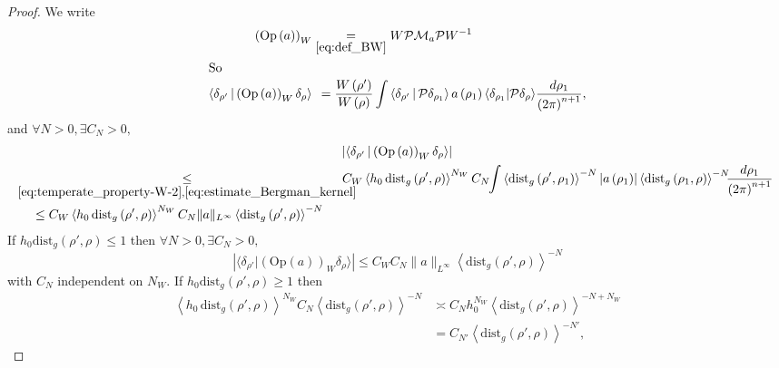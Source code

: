 \documentclass[10pt]{amsart}
\theoremstyle{definition}\newtheorem{defi}[theo]{Definition}\newtheorem{rema}[theo]{Remark}\newtheorem{exam}[theo]{Example}\newtheorem{exem}[theo]{Example}\newtheorem{nota}[theo]{Notation}
\newcommand{\clM}{\mathcal{M}}
\newcommand{\clP}{\mathcal{P}}
\newcommand{\dist}{\mathrm{dist}}
\newcommand{\Opp}{\mathrm{Op}}
\let\oldexists\exists
\renewcommand*{\exists}{\mathrel{\oldexists}}
\let\oldforall\forall
\renewcommand*{\forall}{\mathrel{\oldforall}}
\begin{document}
\begin{proof}
We write
\begin{align*}
\left(\Opp \left(a\right)\right)_{W}&\underset{\eqref{eq:def_BW}}{=} W\clP \clM_{a}\clP W^{-1}
\\
\intertext{So}
\left\langle\delta_{\rho'}\,\middle|\, \left(\Opp \left(a\right)\right)_{W}\delta_{\rho}\right\rangle &\mkern8mu=\frac{W\left(\rho'\right)}{W\left(\rho\right)}\int\left\langle\delta_{\rho'}\,\middle|\,\clP \delta_{\rho_{1}}\right\rangle a\left(\rho_{1}\right)\langle\delta_{\rho_{1}}|\clP \delta_{\rho}\rangle\frac{d\rho_{1}}{\left(2\pi\right)^{n+1}},
\end{align*}
and $\forall N>0,\exists C_{N}>0,$
\begin{multline*}
\left|\langle\delta_{\rho'}\,\middle|\,\left(\Opp \left(a\right)\right)_{W}\delta_{\rho}\rangle\right|\\
\begin{aligned}
&\mkern-10mu\underset{\eqref{eq:temperate_property-W-2},\eqref{eq:estimate_Bergman_kernel}}{\leq}\mkern-25mu C_{W}\left\langle h_{0}\,\dist_{g}\left(\rho',\rho\right)\right\rangle ^{N_{W}}C_{N}\mkern-5mu
\int\left\langle \dist_{g}\left(\rho',\rho_{1}\right)\right\rangle ^{-N}\left|a\left(\rho_{1}\right)\right|\left\langle \dist_{g}\left(\rho_{1},\rho\right)\right\rangle ^{-N}\mkern-8mu\frac{d\rho_{1}}{\left(2\pi\right)^{n+1}}\\
&\mkern15mu\leq  C_{W}\left\langle h_{0}\,\dist_{g}\left(\rho',\rho\right)\right\rangle ^{N_{W}}C_{N}\|a\|_{L^{\infty}}\left\langle \dist_{g}\left(\rho',\rho\right)\right\rangle ^{-N}
\end{aligned}
\end{multline*}
If $h_{0}\dist_{g}(\rho',\rho)\leq1$ then $\forall N>0,\exists C_{N}>0,$
\[
\left|\langle\delta_{\rho'}|\left(\Opp \left(a\right)\right)_{W}\delta_{\rho}\rangle\right|\leq C_{W}C_{N}\|a\|_{L^{\infty}}\left\langle \dist_{g}\left(\rho',\rho\right)\right\rangle ^{-N}
\]
with $C_{N}$ independent on $N_{W}$. If $h_{0}\dist_{g}(\rho',\rho)\geq1$ then
\begin{equation}\label{eq:aide}
\begin{split}
\left\langle h_{0}\,\dist_{g}\left(\rho',\rho\right)\right\rangle ^{N_{W}}C_{N}\left\langle \dist_{g}\left(\rho',\rho\right)\right\rangle ^{-N} & \asymp C_{N}h_{0}^{N_{W}}\left\langle \dist_{g}\left(\rho',\rho\right)\right\rangle ^{-N+N_{W}}
\\
& =C_{N'}\left\langle \dist_{g}\left(\rho',\rho\right)\right\rangle ^{-N'},
\end{split}

\end{equation}
\end{proof}
\end{document}
